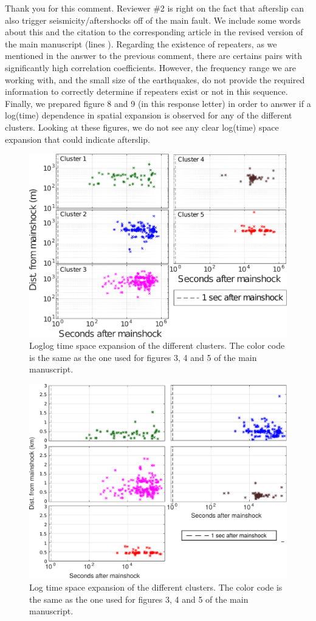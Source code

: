 \documentclass[10pt]{extarticle}
\begin{document}
\begin{Answer}
Thank you for this comment. Reviewer \#2 is right on the fact that afterslip can also trigger seismicity/aftershocks off of the main fault. We include some words about this and the citation to the corresponding article in the revised version of the main manuscript (lines ). Regarding the existence of repeaters, as we mentioned in the answer to the previous comment, there are certains pairs with significantly high correlation coefficients. However, the frequency range we are working with, and the small size of the earthquakes, do not provide the required information to correctly determine if repeaters exist or not in this sequence. Finally, we prepared figure 8 and 9 (in this response letter) in order to answer if a log(time) dependence in spatial expansion is observed for any of the different clusters. Looking at these figures, we do not see any clear log(time) space expansion that could indicate afterslip.
\begin{figure}[!h]
\begin{center}
 \includegraphics[width=0.7\linewidth]{S3_loglog_time.png} 
 \caption{Loglog time space expansion of the different clusters. The color code is the same as the one used for figures 3, 4 and 5 of the main manuscript.}
\end{center}
\end{figure}
\begin{figure}[!h]
\begin{center}
 \includegraphics[width=0.7\linewidth]{logtime_expansion} 
 \caption{Log time space expansion of the different clusters. The color code is the same as the one used for figures 3, 4 and 5 of the main manuscript.}
\end{center}
\end{figure}
 \WorkInProgressRevTask
\end{Answer}
%
%
\end{document}
